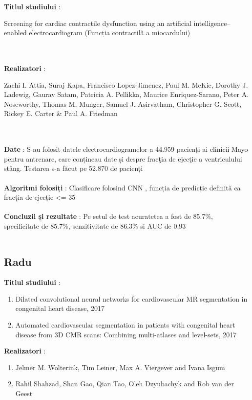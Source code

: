 \documentclass[a4papaer,12pt]{article}
\begin{document}
\textbf{Titlul studiului} : \begin{Large}
Screening for cardiac contractile dysfunction using an artificial intelligence–enabled electrocardiogram
(Funcția contractilă a miocardului)
\end{Large}
\\\\
\indent \textbf{Realizatori} : \begin{large} Zachi I. Attia, Suraj Kapa, Francisco Lopez-Jimenez, Paul M. McKie, Dorothy J. Ladewig, Gaurav Satam, Patricia A. Pellikka, Maurice Enriquez-Sarano, Peter A. Noseworthy, Thomas M. Munger, Samuel J. Asirvatham, Christopher G. Scott, Rickey E. Carter \& Paul A. Friedman 
\end{large}
\\\\
\indent \textbf{Date} : S-au folosit datele electrocardiogramelor a 44.959 pacienți ai clinicii Mayo pentru antrenare, care conțineau date și despre fracţia de ejecţie a ventriculului stâng. Testarea s-a făcut pe 52.870 de pacienți
\\\\
\indent \textbf{Algoritmi folosiți} : Clasificare folosind CNN , funcția de predicție definită ca fracția de ejecție <= 35%
\\\\
\indent \textbf{Concluzii și rezultate} : Pe setul de test acuratetea a fost de 85.7\%, specificitate de 85.7\%, senzitivitate de 86.3\% si AUC de 0.93
\\\\

\subsection{Radu}

\textbf{Titlul studiului} : \begin{Large}\begin{enumerate}[label=\Roman*, font=\bfseries]
\item Dilated convolutional neural networks for cardiovascular MR segmentation in congenital heart disease, 2017
\item Automated cardiovascular segmentation in patients with congenital heart disease from 3D CMR scans: Combining multi-atlases and level-sets, 2017
\end{enumerate}
\end{Large}

\indent \textbf{Realizatori} : \begin{large}\begin{enumerate}[label=\Roman*, font=\bfseries]
\item Jelmer M. Wolterink, Tim Leiner, Max A. Viergever and Ivana Isgum
\item Rahil Shahzad, Shan Gao, Qian Tao, Oleh Dzyubachyk and Rob van der Geest
\end{enumerate}
\end{large}
\end{document}
